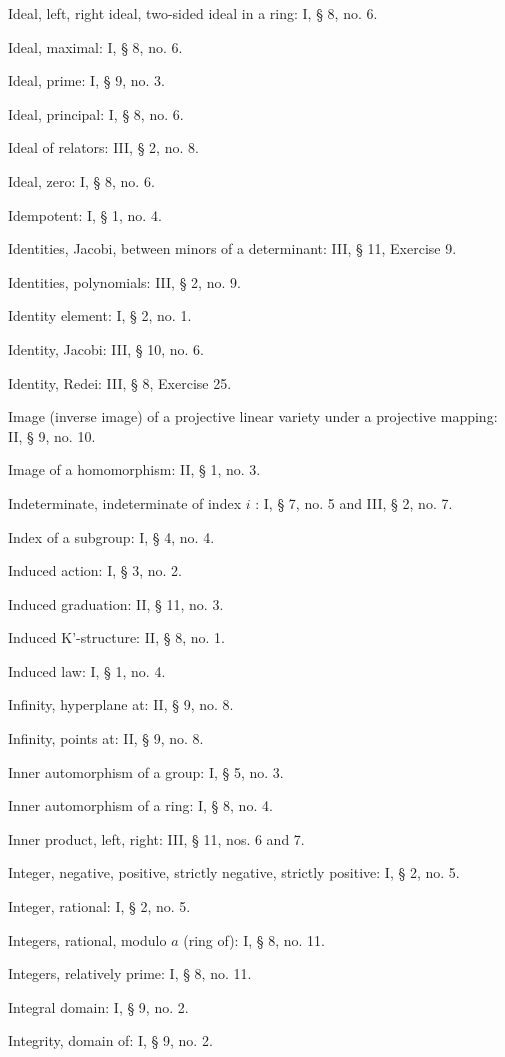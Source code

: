 Ideal, left, right ideal, two-sided ideal in a ring: I, § 8, no. 6.

Ideal, maximal: I, § 8, no. 6.

Ideal, prime: I, § 9, no. 3.

Ideal, principal: I, § 8, no. 6.

Ideal of relators: III, § 2, no. 8.

Ideal, zero: I, § 8, no. 6.

Idempotent: I, § 1, no. 4.

Identities, Jacobi, between minors of a determinant: III, § 11, Exercise 9.

Identities, polynomials: III, § 2, no. 9.

Identity element: I, § 2, no. 1.

Identity, Jacobi: III, § 10, no. 6.

Identity, Redei: III, § 8, Exercise 25.

Image (inverse image) of a projective linear variety under a projective mapping: II, § 9, no. 10.

Image of a homomorphism: II, § 1, no. 3.

Indeterminate, indeterminate of index \(i\) : I, § 7, no. 5 and III, § 2, no. 7.

Index of a subgroup: I, § 4, no. 4.

Induced action: I, § 3, no. 2.

Induced graduation: II, § 11, no. 3.

Induced K'-structure: II, § 8, no. 1.

Induced law: I, § 1, no. 4.

Infinity, hyperplane at: II, § 9, no. 8.

Infinity, points at: II, § 9, no. 8.

Inner automorphism of a group: I, § 5, no. 3.

Inner automorphism of a ring: I, § 8, no. 4.

Inner product, left, right: III, § 11, nos. 6 and 7.

Integer, negative, positive, strictly negative, strictly positive: I, § 2, no. 5.

Integer, rational: I, § 2, no. 5.

Integers, rational, modulo \(a\) (ring of): I, § 8, no. 11.

Integers, relatively prime: I, § 8, no. 11.

Integral domain: I, § 9, no. 2.

Integrity, domain of: I, § 9, no. 2.

